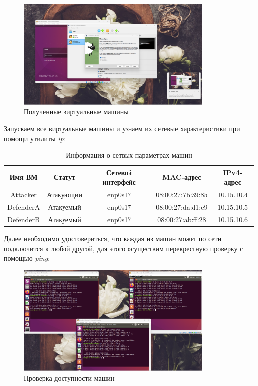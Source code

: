 \documentclass[a4paper]{article}
\begin{document}
  \begin{figure}[H]
    \centering
    \includegraphics[width=0.85\textwidth]{02_00 (41)}
    \caption{Полученные виртуальные машины}
    \label{img:0031}
  \end{figure}

  Запускаем все виртуальные машины и узнаем их сетевые характеристики при помощи утилиты \textit{ip}:

  \begin{table}[H]
    \centering
    \begin{tabular}{| c | c | c | c | c |}
      \hline
      Имя ВМ & Статут & Сетевой интерфейс & MAC-адрес & IPv4-адрес \\
      \hline
      Attacker & Атакующий & enp0s17 & 08:00:27:7b:39:85 & 10.15.10.4 \\
      \hline
      DefenderA & Атакуемый & enp0s17 & 08:00:27:da:d1:e9 & 10.15.10.5 \\
      \hline
      DefenderB & Атакуемый & enp0s17 & 08:00:27:ab:ff:28 & 10.15.10.6 \\
      \hline
    \end{tabular}
    \caption{Информация о сетвых параметрах машин}
  \end{table}

  Далее необходимо удостовериться, что каждая из машин может по сети подключится к любой другой,
  для этого осуществим перекрестную проверку с помощью \textit{ping}:
  
  \begin{figure}[H]
    \centering
    \includegraphics[width=0.85\textwidth]{02_00 (43)}
    \caption{Проверка доступности машин}
    \label{img:0032}
  \end{figure}
\end{document}
